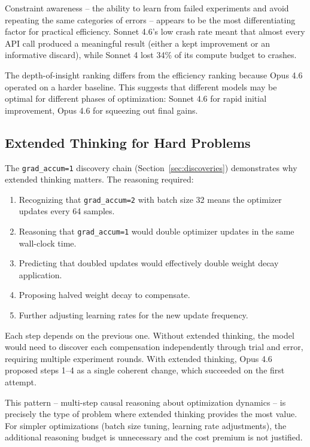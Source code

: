 \documentclass[11pt]{article}
\begin{document}
Constraint awareness -- the ability to learn from failed experiments and avoid repeating the same categories of errors -- appears to be the most differentiating factor for practical efficiency. Sonnet 4.6's low crash rate meant that almost every API call produced a meaningful result (either a kept improvement or an informative discard), while Sonnet 4 lost 34\% of its compute budget to crashes.

The depth-of-insight ranking differs from the efficiency ranking because Opus 4.6 operated on a harder baseline. This suggests that different models may be optimal for different phases of optimization: Sonnet 4.6 for rapid initial improvement, Opus 4.6 for squeezing out final gains.

\subsection{Extended Thinking for Hard Problems}
\label{sec:thinking}

The \texttt{grad\_accum=1} discovery chain (Section~\ref{sec:discoveries}) demonstrates why extended thinking matters. The reasoning required:

\begin{enumerate}[leftmargin=*]
    \item Recognizing that \texttt{grad\_accum=2} with batch size 32 means the optimizer updates every 64 samples.
    \item Reasoning that \texttt{grad\_accum=1} would double optimizer updates in the same wall-clock time.
    \item Predicting that doubled updates would effectively double weight decay application.
    \item Proposing halved weight decay to compensate.
    \item Further adjusting learning rates for the new update frequency.
\end{enumerate}

Each step depends on the previous one. Without extended thinking, the model would need to discover each compensation independently through trial and error, requiring multiple experiment rounds. With extended thinking, Opus 4.6 proposed steps 1--4 as a single coherent change, which succeeded on the first attempt.

This pattern -- multi-step causal reasoning about optimization dynamics -- is precisely the type of problem where extended thinking provides the most value. For simpler optimizations (batch size tuning, learning rate adjustments), the additional reasoning budget is unnecessary and the cost premium is not justified.
\end{document}
